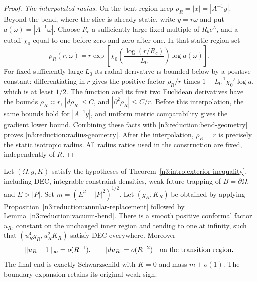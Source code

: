 \begin{proof}
\emph{The interpolated radius.} On the bent region keep
$\rho_R=|x|=|A^{-1}y|$.  Beyond the bend, where the slice is already
static, write $y=r\omega$ and put $a(\omega)=|A^{-1}\omega|$.  Choose
$R_c$ a sufficiently large fixed multiple of $R_b e^L$, and a cutoff
$\chi_0$ equal to one before zero and zero after one.  In that static
region set
\[
 \rho_R(r,\omega)
 =r\exp\left[
    \chi_0\left(\frac{\log(r/R_c)}{L_0}\right)\log a(\omega)\right].
\]
For fixed sufficiently large $L_0$ its radial derivative is bounded
below by a positive constant: differentiating in $r$ gives the positive
factor $\rho_R/r$ times
$1+L_0^{-1}\chi_0'\log a$, which is at least $1/2$.
The function and its first two Euclidean derivatives have the bounds
$\rho_R\asymp r$, $|d\rho_R|\le C$, and
$|\partial^2\rho_R|\le C/r$.  Before this interpolation, the same
bounds hold for $|A^{-1}y|$, and uniform metric comparability gives the
gradient lower bound.  Combining these facts with
\eqref{n3:reduction:bend-geometry} proves
\eqref{n3:reduction:radius-geometry}.  After the interpolation,
$\rho_R=r$ is precisely the static isotropic radius.  All radius ratios
used in the construction are fixed, independently of $R$.
\end{proof}

\begin{lemma}
\label{n3:reduction:radial-repair}
Let $(\Omega,g,K)$ satisfy the hypotheses of
Theorem~\ref{n3:intro:exterior-inequality}, including DEC, integrable
constraint densities, weak future trapping of $B=\partial\Omega$,
and $E>|P|$. Set $m=(E^2-|P|^2)^{1/2}$. Let $(g_R,K_R)$ be obtained
by applying Proposition~\ref{n3:reduction:annular-replacement} followed
by Lemma~\ref{n3:reduction:vacuum-bend}.  There is a smooth positive conformal
factor $u_R$, constant on the unchanged inner region and tending to one
at infinity, such that $(u_R^4g_R,u_R^2K_R)$ satisfy DEC everywhere.
Moreover
\begin{equation}
 \label{n3:reduction:repair-size}
 \|u_R-1\|_\infty=o(R^{-1}),\qquad
 |du_R|=o(R^{-2})\quad\hbox{on the transition region}.
\end{equation}
The final end is exactly Schwarzschild with $K=0$ and mass
$m+o(1)$.  The boundary expansion retains its original weak sign.
\end{lemma}

